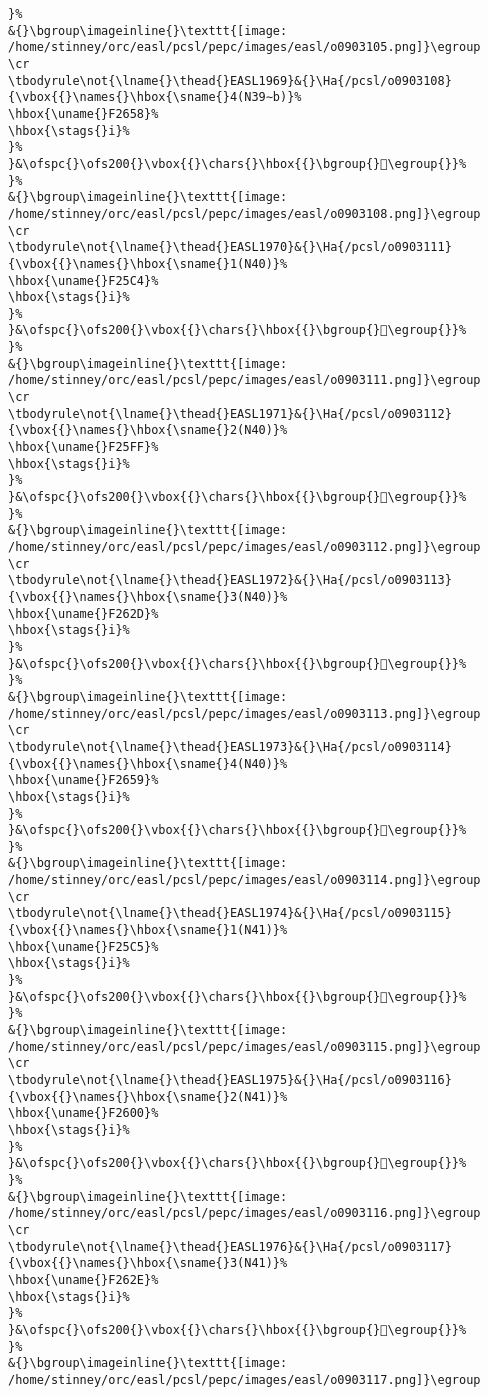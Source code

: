 \begin{verbatim}
}%
&{}\bgroup\imageinline{}\texttt{[image: /home/stinney/orc/easl/pcsl/pepc/images/easl/o0903105.png]}\egroup
\cr
\tbodyrule\not{\lname{}\thead{}EASL1969}&{}\Ha{/pcsl/o0903108}{\vbox{{}\names{}\hbox{\sname{}4(N39∼b)}%
\hbox{\uname{}F2658}%
\hbox{\stags{}i}%
}%
}&\ofspc{}\ofs200{}\vbox{{}\chars{}\hbox{{}\bgroup{}󲙘\egroup{}}%
}%
&{}\bgroup\imageinline{}\texttt{[image: /home/stinney/orc/easl/pcsl/pepc/images/easl/o0903108.png]}\egroup
\cr
\tbodyrule\not{\lname{}\thead{}EASL1970}&{}\Ha{/pcsl/o0903111}{\vbox{{}\names{}\hbox{\sname{}1(N40)}%
\hbox{\uname{}F25C4}%
\hbox{\stags{}i}%
}%
}&\ofspc{}\ofs200{}\vbox{{}\chars{}\hbox{{}\bgroup{}󲗄\egroup{}}%
}%
&{}\bgroup\imageinline{}\texttt{[image: /home/stinney/orc/easl/pcsl/pepc/images/easl/o0903111.png]}\egroup
\cr
\tbodyrule\not{\lname{}\thead{}EASL1971}&{}\Ha{/pcsl/o0903112}{\vbox{{}\names{}\hbox{\sname{}2(N40)}%
\hbox{\uname{}F25FF}%
\hbox{\stags{}i}%
}%
}&\ofspc{}\ofs200{}\vbox{{}\chars{}\hbox{{}\bgroup{}󲗿\egroup{}}%
}%
&{}\bgroup\imageinline{}\texttt{[image: /home/stinney/orc/easl/pcsl/pepc/images/easl/o0903112.png]}\egroup
\cr
\tbodyrule\not{\lname{}\thead{}EASL1972}&{}\Ha{/pcsl/o0903113}{\vbox{{}\names{}\hbox{\sname{}3(N40)}%
\hbox{\uname{}F262D}%
\hbox{\stags{}i}%
}%
}&\ofspc{}\ofs200{}\vbox{{}\chars{}\hbox{{}\bgroup{}󲘭\egroup{}}%
}%
&{}\bgroup\imageinline{}\texttt{[image: /home/stinney/orc/easl/pcsl/pepc/images/easl/o0903113.png]}\egroup
\cr
\tbodyrule\not{\lname{}\thead{}EASL1973}&{}\Ha{/pcsl/o0903114}{\vbox{{}\names{}\hbox{\sname{}4(N40)}%
\hbox{\uname{}F2659}%
\hbox{\stags{}i}%
}%
}&\ofspc{}\ofs200{}\vbox{{}\chars{}\hbox{{}\bgroup{}󲙙\egroup{}}%
}%
&{}\bgroup\imageinline{}\texttt{[image: /home/stinney/orc/easl/pcsl/pepc/images/easl/o0903114.png]}\egroup
\cr
\tbodyrule\not{\lname{}\thead{}EASL1974}&{}\Ha{/pcsl/o0903115}{\vbox{{}\names{}\hbox{\sname{}1(N41)}%
\hbox{\uname{}F25C5}%
\hbox{\stags{}i}%
}%
}&\ofspc{}\ofs200{}\vbox{{}\chars{}\hbox{{}\bgroup{}󲗅\egroup{}}%
}%
&{}\bgroup\imageinline{}\texttt{[image: /home/stinney/orc/easl/pcsl/pepc/images/easl/o0903115.png]}\egroup
\cr
\tbodyrule\not{\lname{}\thead{}EASL1975}&{}\Ha{/pcsl/o0903116}{\vbox{{}\names{}\hbox{\sname{}2(N41)}%
\hbox{\uname{}F2600}%
\hbox{\stags{}i}%
}%
}&\ofspc{}\ofs200{}\vbox{{}\chars{}\hbox{{}\bgroup{}󲘀\egroup{}}%
}%
&{}\bgroup\imageinline{}\texttt{[image: /home/stinney/orc/easl/pcsl/pepc/images/easl/o0903116.png]}\egroup
\cr
\tbodyrule\not{\lname{}\thead{}EASL1976}&{}\Ha{/pcsl/o0903117}{\vbox{{}\names{}\hbox{\sname{}3(N41)}%
\hbox{\uname{}F262E}%
\hbox{\stags{}i}%
}%
}&\ofspc{}\ofs200{}\vbox{{}\chars{}\hbox{{}\bgroup{}󲘮\egroup{}}%
}%
&{}\bgroup\imageinline{}\texttt{[image: /home/stinney/orc/easl/pcsl/pepc/images/easl/o0903117.png]}\egroup

\end{verbatim}
